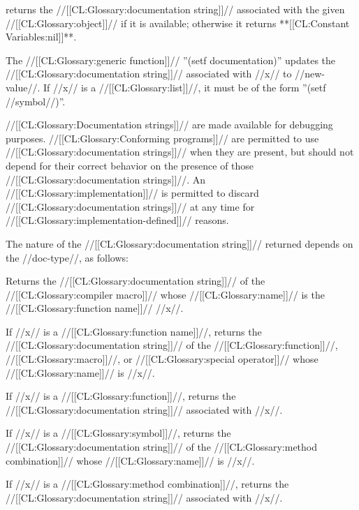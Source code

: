  returns the //[[CL:Glossary:documentation string]]// associated with the given //[[CL:Glossary:object]]// if it is available; otherwise it returns **[[CL:Constant Variables:nil]]**.

The //[[CL:Glossary:generic function]]// ''(setf documentation)'' updates the //[[CL:Glossary:documentation string]]// associated with //x// to //new-value//. If //x// is a //[[CL:Glossary:list]]//, it must be of the form ''(setf //symbol//)''.

//[[CL:Glossary:Documentation strings]]// are made available for debugging purposes. //[[CL:Glossary:Conforming programs]]// are permitted to use //[[CL:Glossary:documentation strings]]// when they are present, but should not depend for their correct behavior on the presence of those //[[CL:Glossary:documentation strings]]//. An //[[CL:Glossary:implementation]]// is permitted to discard //[[CL:Glossary:documentation strings]]// at any time for //[[CL:Glossary:implementation-defined]]// reasons.

The nature of the //[[CL:Glossary:documentation string]]// returned depends on the //doc-type//, as follows:

\beginlist


Returns the //[[CL:Glossary:documentation string]]// of the //[[CL:Glossary:compiler macro]]// whose //[[CL:Glossary:name]]// is the //[[CL:Glossary:function name]]// //x//.


If //x// is a //[[CL:Glossary:function name]]//, returns the //[[CL:Glossary:documentation string]]// of the //[[CL:Glossary:function]]//, //[[CL:Glossary:macro]]//, or //[[CL:Glossary:special operator]]// whose //[[CL:Glossary:name]]// is //x//.

If //x// is a //[[CL:Glossary:function]]//, returns the //[[CL:Glossary:documentation string]]// associated with //x//.


If //x// is a //[[CL:Glossary:symbol]]//, returns the //[[CL:Glossary:documentation string]]// of the //[[CL:Glossary:method combination]]// whose //[[CL:Glossary:name]]// is //x//.

If //x// is a //[[CL:Glossary:method combination]]//, returns the //[[CL:Glossary:documentation string]]// associated with //x//.


